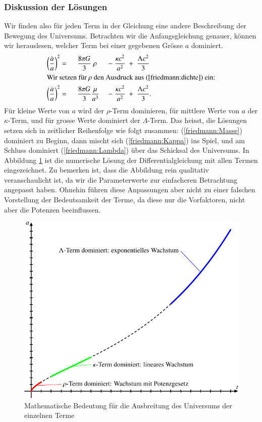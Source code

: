 \begin{refsection}
\subsubsection{Diskussion der Lösungen}
Wir finden also für jeden Term in der Gleichung eine andere Beschreibung der Bewegung des Universums. Betrachten wir die Anfangsgleichung genauer, können wir herauslesen, welcher Term bei einer gegebenen Grösse $a$ dominiert.
\begin{alignat}{5}
	\left(\frac{\dot{a}}{a}\right) ^2 &= \;\; &\frac{8 \pi G}{3}&\;\rho\; &-\;\frac{\kappa c^2}{a^2}\; &+ \;\frac{\Lambda c^2}{3}\\
	\intertext{Wir setzen für $\rho$ den Ausdruck aus (\ref{friedmann:dichte}) ein:}
	\left(\frac{\dot{a}}{a}\right) ^2 &= \;\;&\frac{8 \pi G}{3} &\frac{\mu}{a^3}\; &-\;\frac{\kappa c^2}{a^2}\; &+\; \frac{\Lambda c^2}{3}.
\end{alignat}
Für kleine Werte von $a$ wird der $\rho$-Term dominieren, für mittlere Werte von $a$ der $\kappa$-Term, und für grosse Werte dominiert der $\Lambda$-Term. Das heisst, die Lösungen setzen sich in zeitlicher Reihenfolge wie folgt zusammen: (\ref{friedmann:Masse})  dominiert zu Beginn, dann mischt sich (\ref{friedmann:Kappa}) ins Spiel, und am Schluss dominiert (\ref{friedmann:Lambda}) über das Schicksal des Universums. In Abbildung \ref{friedmann:mathematischFriedmann} ist die numerische Lösung der Differentialgleichung mit allen Termen eingezeichnet.
Zu bemerken ist, dass die Abbildung rein qualitativ veranschaulicht ist, da wir die Parameterwerte zur einfacheren Betrachtung angepasst haben. Ohnehin führen diese Anpassungen aber nicht zu einer falschen Vorstellung der Bedeutsamkeit der Terme, da diese nur die Vorfaktoren, nicht aber die Potenzen beeinflussen. 
\begin{figure}[h]
	\centering
	\includegraphics{friedmann/images/friedmann-2.pdf}
	\caption{Mathematische Bedeutung für die Ausbreitung des Universums der einzelnen Terme}
	\label{friedmann:mathematischFriedmann}
\end{figure}%

\end{refsection}
